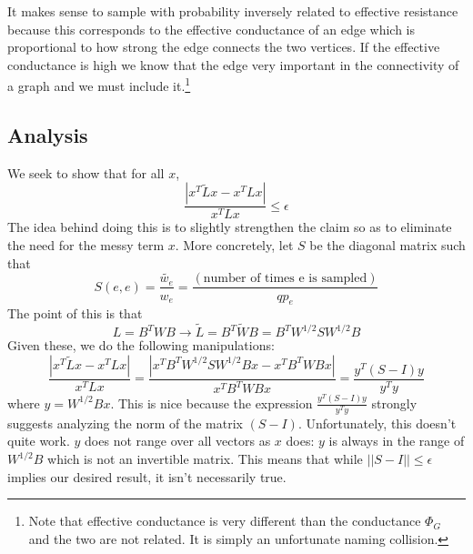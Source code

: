 \documentclass[12pt,twoside]{article}
\begin{document}
It makes sense to sample with probability inversely related to effective resistance because this corresponds to the effective conductance of an edge which is proportional to how strong the edge connects the two vertices. If the effective conductance is high we know that the edge very important in the connectivity of a graph and we must include it.\footnote{Note that effective conductance is very different than the conductance $\Phi_G$ and the two are not related. It is simply an unfortunate naming collision.}

\subsection{Analysis}

We seek to show that for all $x$, 
%
\begin{equation*}
\frac{|x^T\tilde{L}x - x^TLx|}{x^TLx} \leq \epsilon
\end{equation*}
%
The idea behind doing this is to slightly strengthen the claim so as to eliminate the need for the messy term $x$. More concretely, let $S$ be the diagonal matrix such that 
%
\begin{equation}
S(e,e) = \frac{\tilde{w_e}}{w_e} = \frac{(\text{number of times e is sampled})}{qp_e}
\end{equation}
%
The point of this is that 
%
\begin{equation}
L = B^TWB \rightarrow
\tilde{L} = B^T\tilde{W}B = B^TW^{1/2}SW^{1/2}B
\end{equation}
%
Given these, we do the following manipulations:
%
\begin{equation*}
\frac{|x^T\tilde{L}x - x^TLx|}{x^TLx} = \frac{|x^TB^TW^{1/2}SW^{1/2}Bx - x^TB^TWBx|}{x^TB^TWBx} = \frac{y^T(S-I)y}{y^Ty}
\end{equation*}
%
where $y = W^{1/2}Bx$. This is nice because the expression $\frac{y^T(S-I)y}{y^Ty}$ strongly suggests analyzing the norm of the matrix $(S-I)$. Unfortunately, this doesn't quite work. $y$ does not range over all vectors as $x$ does: $y$ is always in the range of $W^{1/2}B$ which is not an invertible matrix. This means that while $||S - I|| \leq \epsilon$ implies our desired result, it isn't necessarily true. 
\end{document}
